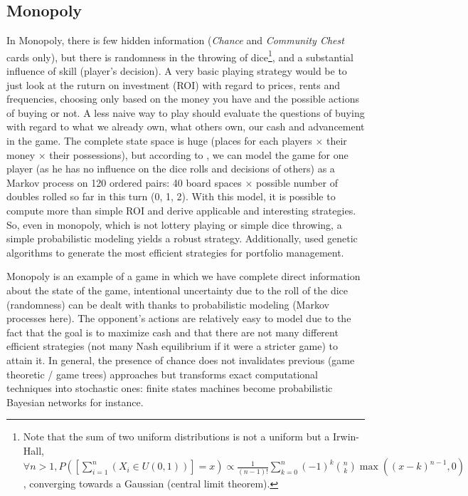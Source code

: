 \subsection{Monopoly}
In Monopoly, there is few hidden information (\textit{Chance} and \textit{Community Chest} cards only), but there is randomness in the throwing of dice\footnote{Note that the sum of two uniform distributions is not a uniform but a Irwin-Hall, $\forall n>1, P([\sum_{i=1}^n{(X_i\in U(0,1))}]=x) \propto \frac{1}{(n-1)!}\sum_{k=0}^n(-1)^k{n\choose k}\max{((x-k)^{n-1},0)}$, converging towards a Gaussian (central limit theorem).}, and a substantial influence of skill (player's decision). A very basic playing strategy would be to just look at the ruturn on investment (ROI) with regard to prices, rents and frequencies, choosing only based on the money you have and the possible actions of buying or not. A less naive way to play should evaluate the questions of buying with regard to what we already own, what others own, our cash and advancement in the game. The complete state space is huge (places for each players $\times$ their money $\times$ their possessions), but according to \cite{MonopolyMarkov}, we can model the game for one player (as he has no influence on the dice rolls and decisions of others) as a Markov process on 120 ordered pairs: 40 board spaces $\times$ possible number of doubles rolled so far in this turn (0, 1, 2). With this model, it is possible to compute more than simple ROI and derive applicable and interesting strategies. So, even in monopoly, which is not lottery playing or simple dice throwing, a simple probabilistic modeling yields a robust strategy. Additionally, \cite{MonopolyFrayn05} used genetic algorithms to generate the most efficient strategies for portfolio management. %

Monopoly is an example of a game in which we have complete direct information about the state of the game, intentional uncertainty due to the roll of the dice (randomness) can be dealt with thanks to probabilistic modeling (Markov processes here). The opponent's actions are relatively easy to model due to the fact that the goal is to maximize cash and that there are not many different efficient strategies (not many Nash equilibrium if it were a stricter game) to attain it. In general, the presence of chance does not invalidates previous (game theoretic / game trees) approaches but transforms exact computational techniques into stochastic ones: finite states machines become probabilistic Bayesian networks for instance.

